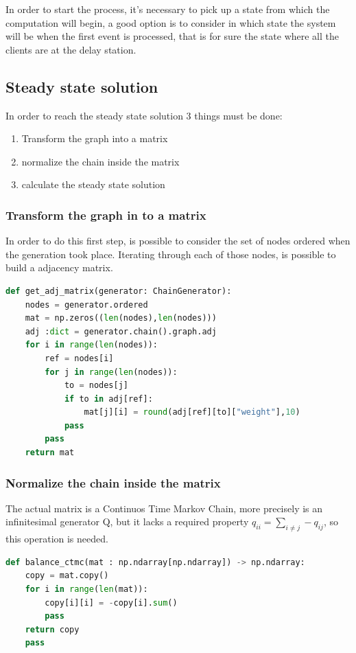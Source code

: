 \documentclass[12pt,a4paper]{article}
\begin{document}
In order to start the process, it's necessary to pick up a state from which the computation will begin, a good option is to consider in which state the system will be when the first event is processed, that is for sure the state where all the clients are at the delay station.

\subsection{Steady state solution}
In order to reach the steady state solution 3 things must be done:
\begin{enumerate}
    \item Transform the graph into a matrix 
    \item normalize the chain inside the matrix 
    \item calculate the steady state solution
\end{enumerate}

\subsubsection{Transform the graph in to a matrix}
In order to do this first step, is possible to consider the set of nodes ordered when the generation took place. Iterating through each of those nodes, is possible to build a adjacency matrix.
\begin{lstlisting}[language=python]
   def get_adj_matrix(generator: ChainGenerator):
    nodes = generator.ordered
    mat = np.zeros((len(nodes),len(nodes)))
    adj :dict = generator.chain().graph.adj
    for i in range(len(nodes)):
        ref = nodes[i]
        for j in range(len(nodes)):
            to = nodes[j]
            if to in adj[ref]:
                mat[j][i] = round(adj[ref][to]["weight"],10)
            pass
        pass
    return mat
\end{lstlisting}

\subsubsection{Normalize the chain inside the matrix}
The actual matrix is a Continuos Time Markov Chain, more precisely is an infinitesimal generator Q, but it lacks a required property $q_{ii}=\sum_{i \neq j} - q_{ij}$, so this operation is needed.

\begin{lstlisting}[language=python]
  def balance_ctmc(mat : np.ndarray[np.ndarray]) -> np.ndarray:
    copy = mat.copy()
    for i in range(len(mat)):
        copy[i][i] = -copy[i].sum()
        pass
    return copy
    pass
\end{lstlisting}
\end{document}
